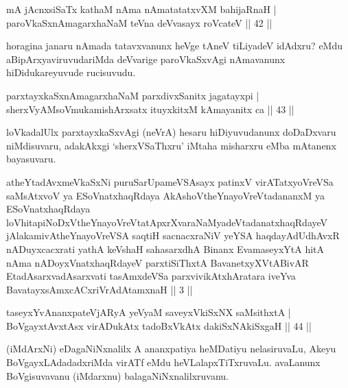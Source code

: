 
\begin{shl}
mA jAcnxsiSaTx kathaM nAma nAmatatatxvXM bahijaRnaH |\\
paroVkaSxnAmagarxhaNaM teVna deVvasayx roVcateV \hfill || 42 || 
\end{shl}

\begin{artha}
horagina janaru nAmada tatavxvanunx heVge tAneV tiLiyadeV idAdxru? eMdu aBipArxyaviruvudariMda deVvarige paroVkaSxvAgi nAmavanunx hiDidukareyuvude rucisuvudu.
\end{artha}


\begin{shl}
parxtayxkaSxnAmagarxhaNaM parxdivxSanitx jagatayxpi |\\
sherxVyAMsoV\s mukamishArxsatx ituyxkitxM kAmayanitx ca \hfill || 43 || 
\end{shl}

\begin{artha}
loVkadalUlx parxtayxkaSxvAgi (neVrA) hesaru hiDiyuvudanunx doDaDxvaru niMdisu\-varu, adakAkxgi `sherxVSaThxru' iMtaha misharxru eMba mAtanenx bayasuvaru.
\end{artha}
\begin{kandikeshl}
atheYtadAvxmeV\s kaSxNi puruSarUpameVSAsayx patinxV virATatxyoVreVSa saMsAtxvoV ya ESoV\s natxhaqRdaya AkAshoV\s theYnayoVreVtadananxM ya ESoV\s natxhaqRdaya loVhitapiNoDxV\s theYnayoVreVtatApxrXvaraNaM\break yadeVtadanatxhaqRdayeV jAlakamivAtheYnayoVreVSA saqtiH sacnacxraNiV yeYSA haqdayAdUdhAvxR nADuyxcacxrati yathA keVshaH sahasarxdhA Binanx EvamaseyxYtA hitA nAma nADoyxV\s natxhaqRdayeV parxtiSiThxtA BavanetxyXVtABivAR EtadAsarxvadAsarxvati tasAmxdeVSa parxvivikAtxhAratara iveYva BavatayxsAmxcACxriVrAdAtamxnaH || 3 ||
\end{kandikeshl}


\begin{shl}
taseyxYvAnanxpateVjARyA yeVyaM saveyxV\s kiSxNX saMsithxtA |\\
BoVgayxtAvxtAsx virADukAtx tadoBxVkAtx dakiSxNAkiSxgaH \hfill || 44 || 
\end{shl}

\begin{artha}
(iMdArxNi) eDagaNiNxnalilx A ananxpatiya heMDatiyu nelasiruvaLu, Akeyu BoVgayxLAdadadxriMda virATf eMdu heVLalapxTiTxruvaLu. avaLanunx BoVgisuvavanu (iMdarxnu) balagaNiNxnalilxruvanu.
\end{artha}

